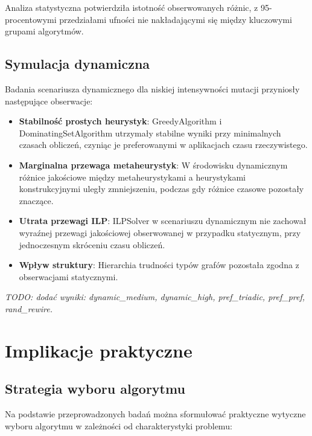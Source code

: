 Analiza statystyczna potwierdziła istotność obserwowanych różnic, z 95-procentowymi przedziałami ufności nie nakładającymi się między kluczowymi grupami algorytmów.

\subsection{Symulacja dynamiczna}

Badania scenariusza dynamicznego dla niskiej intensywności mutacji przyniosły następujące obserwacje:

\begin{itemize}
\item \textbf{Stabilność prostych heurystyk}: GreedyAlgorithm i DominatingSetAlgorithm utrzymały stabilne wyniki przy minimalnych czasach obliczeń, czyniąc je preferowanymi w aplikacjach czasu rzeczywistego.

\item \textbf{Marginalna przewaga metaheurystyk}: W środowisku dynamicznym różnice jakościowe między metaheurystykami a heurystykami konstrukcyjnymi uległy zmniejszeniu, podczas gdy różnice czasowe pozostały znaczące.

\item \textbf{Utrata przewagi ILP}: ILPSolver w scenariuszu dynamicznym nie zachował wyraźnej przewagi jakościowej obserwowanej w przypadku statycznym, przy jednoczesnym skróceniu czasu obliczeń.

\item \textbf{Wpływ struktury}: Hierarchia trudności typów grafów pozostała zgodna z obserwacjami statycznymi.
\end{itemize}

\emph{TODO: dodać wyniki: dynamic\_medium, dynamic\_high, pref\_triadic, pref\_pref, rand\_rewire.}

\section{Implikacje praktyczne}

\subsection{Strategia wyboru algorytmu}

Na podstawie przeprowadzonych badań można sformułować praktyczne wytyczne wyboru algorytmu w zależności od charakterystyki problemu:

